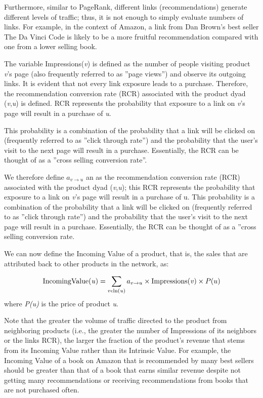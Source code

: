Furthermore, similar to PageRank, different links (recommendations) generate different levels of traffic; thus, it is not enough to simply evaluate numbers of links. For example, in the context of Amazon, a link from Dan Brown’s best seller The Da Vinci Code is likely to be a more fruitful recommendation compared with one from a lower selling book.

The variable Impressions(\textit{v}) is defined as the number of people visiting product \textit{v}’s page (also frequently referred to as ”page views”) and observe its outgoing links. It is evident that not every link exposure leads to a purchase. Therefore, the recommendation conversion rate (RCR) associated with the product dyad (\textit{v},\textit{u}) is defined. RCR represents the probability that exposure to a link on \textit{v}’s page will result in a purchase of \textit{u}.

This probability is a combination of the probability that a link will be clicked on (frequently referred to as ”click through rate”) and the probability that the user’s visit to the next page will result in a purchase. Essentially, the RCR can be thought of as a ”cross selling conversion rate”.

We therefore define \textit{$a_{v \rightarrow u}$} an as the recommendation conversion rate (RCR) associated with the product dyad (\textit{v},\textit{u}); this RCR represents the probability that exposure to a link on \textit{v}’s page will result in a purchase of u. This probability is a combination of the probability that a link will be clicked on (frequently referred to as ”click through rate”) and the probability that the user’s visit to the next page will result in a purchase. Essentially, the RCR can be thought of as a ”cross selling conversion rate.

We can now define the Incoming Value of a product, that is, the sales that are attributed back to other products in the network, as:

\begin{equation}
\textrm{IncomingValue(\textit{u})} = \sum_{v \epsilon \textrm{ln(\textit{u})}} a_{v \rightarrow u} \times \textrm{Impressions(\textit{v})} \times P(u)
\end{equation}
where \textit{P(u)} is the price of product \textit{u}.

Note that the greater the volume of traffic directed to the product from neighboring products (i.e., the greater the number of Impressions of its neighbors or the links RCR), the larger the fraction of the product’s revenue that stems from its Incoming Value rather than its Intrinsic Value. For example, the Incoming Value of a book on Amazon that is recommended by many best sellers should be greater than that of a book that earns similar revenue despite not getting many recommendations or receiving recommendations from books that are not purchased often.

